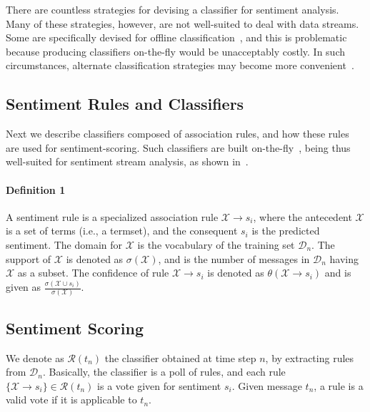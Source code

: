\documentclass{sig-alternate}
\begin{document}
There are countless strategies for devising
a classifier for sentiment analysis. Many of these strategies, however, are not well-suited to deal with data streams. Some are specifically devised for offline classification~\cite{trees,cortes}, and this is problematic because producing classifiers on-the-fly would be unacceptably costly. %
In such circumstances, alternate classification strategies may become more convenient~\cite{calibrated}.

\subsection{Sentiment Rules and Classifiers}

Next we describe classifiers composed of association rules, and how these rules are used for sentiment-scoring. Such classifiers are built on-the-fly~\cite{hipc,lac}, being thus well-suited for sentiment stream analysis, as shown in~\cite{sigir}.

\paragraph*{\bf{Definition 1}}
A sentiment rule is a specialized association rule $\mathcal{X}\xrightarrow{}s_i$, where the antecedent $\mathcal{X}$ is a set of terms (i.e., a termset), and the consequent $s_i$ is the predicted sentiment. The domain for $\mathcal{X}$ is the vocabulary of the training set $\mathcal{D}_n$.
The support of $\mathcal{X}$ is denoted as $\sigma(\mathcal{X})$, and is the number of messages in $\mathcal{D}_n$ having $\mathcal{X}$ as a subset. The confidence of rule $\mathcal{X}\xrightarrow{}s_i$ is denoted as $\theta(\mathcal{X}\xrightarrow{}s_i)$ and is given as $\displaystyle\frac{\sigma(\mathcal{X}\cup s_i)}{\sigma(\mathcal{X})}$.\\

\subsection*{Sentiment Scoring}

We denote as $\mathcal{R}(t_n)$ the classifier obtained at time step $n$, by extracting rules from $\mathcal{D}_n$.
Basically, the classifier is a poll of rules, and each rule $\{\mathcal{X}\xrightarrow{}s_i\}\in\mathcal{R}(t_n)$ is a vote given for sentiment $s_i$. Given message $t_n$, a rule is a valid vote if it is applicable to $t_n$.
\end{document}
